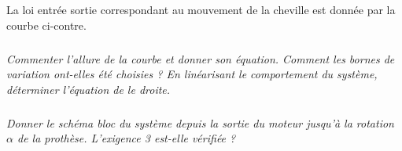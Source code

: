 \documentclass[10pt]{article}
\newif\ifprof
\begin{document}
\else
\fi


\begin{minipage}[c]{.47\linewidth}
La loi entrée sortie correspondant au mouvement de la cheville est donnée par la courbe ci-contre.

\subparagraph{}
\textit{Commenter l'allure de la courbe et donner son équation. Comment les bornes de variation ont-elles été choisies ? En linéarisant le comportement du système, déterminer l'équation de le droite.}


\subparagraph{}
\textit{Donner le schéma bloc du système depuis la sortie du moteur jusqu'à la rotation $\alpha$ de la prothèse. L'exigence 3 est-elle vérifiée ?}

\end{minipage}\hfill
\begin{minipage}[c]{.47\linewidth}
\begin{center}
\end{center}
\end{minipage}


\ifprof
\begin{corrige}
D'après les notes de l'ibd, le domaine de variation de l'angle de la cheville doit être compris entre -25 et 15 degrés. Sur cette plage, on observe qu'il est possible de linéariser le comportement de la cheville. 

 Ainsi, pour 2 couples de points $( -20,110)$ et $(10,130)$, le coefficient directeur est donné par :  $m=\dfrac{130-110}{10-(-20)} = \dfrac{20}{30}\simeq 0,66 \; mm/\text{\textdegree}\simeq 240 \; mm/tour$.
 
 L'ordonnée à l'origine est donnée par : 
 $y=m x+p \Leftarrow p = 110-\dfrac{2}{3} (-20) \simeq 123 \; mm$.  
\end{corrige}

\begin{corrige}
\begin{center}
\end{center}

Le moteur ayant une fréquence de rotation nominale de 7 600 tr/min, la fréquence de rotation de la cheville sera de :
$$
\alpha_v = \omega_m \cdot \dfrac{1}{k}\cdot p_v \cdot \dfrac{1}{m} \cdot 
7\,600 \cdot \dfrac{1}{2,1}\cdot 3 \cdot \dfrac{1}{240} \simeq 45,24 tr/min \simeq 
4,73\; rad /s.
$$

La vitesse maximale demandée par le cahier des charges n'est donc pas dépassée. L'exigence est donc satisfaite. 

\end{corrige}
\else
\fi
\end{document}
